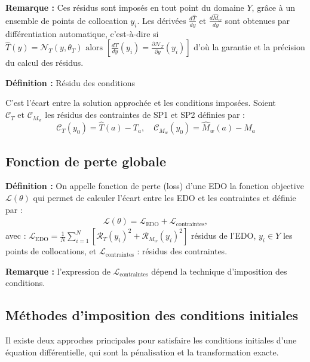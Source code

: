 \documentclass[12pt, oneside]{report} %
\theoremstyle{definition}
\theoremstyle{remark}
\begin{document}
\textbf{Remarque : }Ces résidus sont imposés en tout point du domaine $Y$, grâce à un ensemble de points de collocation $y_i$.
Les dérivées $ \frac{d\hat{T}}{dy} \text{ et }  \frac{d\hat{M}_w}{dy} $ sont obtenues par différentiation automatique, c'est-à-dire si $ \hat{T}(y) = \mathcal{N}_T(y, \theta_T) \text{ alors }\left[\frac{d\hat{T}}{dy}(y_i) = \frac{\partial\mathcal{N}_T}{\partial y}(y_i) \right]$ d'où la garantie et la précision du calcul des résidus.

	
		
	\textbf{Définition : }Résidu des conditions 
			
			C'est l'écart entre la solution approchée et les conditions imposées.
			Soient $\mathcal{C}_T \text{ et } \mathcal{C}_{M_w} $ les résidus des contraintes de SP1 et SP2 définies par :
			\begin{equation}
				\mathcal{C}_T(y_0) = \hat{T}(a) - T_{a}, \quad
				\mathcal{C}_{M_w} (y_0) = \hat{M}_w(a) - M_{a}  
			\end{equation} 
		
		\subsection{Fonction de perte globale}	
		
		\textbf{Définition : }
			On appelle fonction de perte (loss) d'une EDO la fonction objective $\mathcal{L}( \theta )$  qui permet de calculer l'écart entre les EDO et les contraintes et définie par : 
			\begin{align}\label{f:cout}
				\mathcal{L}(\theta) = \mathcal{L}_{\text{EDO}} + \mathcal{L}_{\text{contraintes}}, 
			\end{align}
avec : $\mathcal{L}_{\text{EDO}} = \frac{1}{N}\sum_{i=1}^{N}\left[\mathcal{R}_T(y_i)^2 +  \mathcal{R}_{M_w}(y_i)^2\right]$ résidus de l'EDO, 
$y_i \in Y$ les points de collocations, 
et   $\mathcal{L}_{\text{contraintes}}$ : résidus des contraintes.
	
	
		\textbf{Remarque : }l'expression de $\mathcal{L}_{\text{contraintes}}$ dépend la technique d'imposition des conditions.
			
		
	\subsection{Méthodes d'imposition des conditions initiales}
	Il existe deux approches principales pour satisfaire les conditions initiales d'une équation différentielle, qui sont la pénalisation et la transformation exacte.
\end{document}
